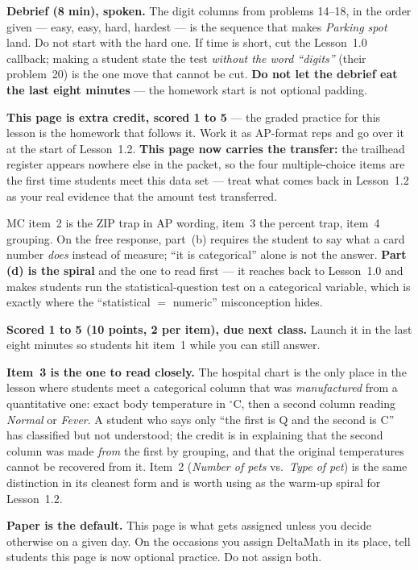 \documentclass[10pt]{article}
\begin{document}
\begin{teachernote}
\textbf{Debrief (8 min), spoken.} The digit columns from problems 14--18, in the order given
--- easy, easy, hard, hardest --- is the sequence that makes \emph{Parking spot} land. Do not
start with the hard one. If time is short, cut the Lesson~1.0 callback; making a student state
the test \emph{without the word ``digits''} (their problem~20) is the one move that cannot be
cut. \textbf{Do not let the debrief eat the last eight minutes} --- the homework start is not
optional padding.
\end{teachernote}

\begin{teachernote}[AP Practice]
\textbf{This page is extra credit, scored 1 to 5} --- the graded practice for this lesson is the homework that
follows it. Work it as AP-format reps and go over it at the start of Lesson~1.2. \textbf{This page now
carries the transfer:} the trailhead register appears nowhere else in the packet, so the four
multiple-choice items are the first time students meet this data set --- treat what comes back
in Lesson~1.2 as your real evidence that the amount test transferred.

MC item~2 is the ZIP trap in AP wording, item~3 the percent trap, item~4 grouping. On the free
response, part~(b) requires the student to say what a card number \emph{does} instead of measure;
``it is categorical'' alone is not the answer. \textbf{Part (d) is the spiral} and the one to read
first --- it reaches back to Lesson~1.0 and makes students run the statistical-question test on a
categorical variable, which is exactly where the ``statistical $=$ numeric'' misconception hides.
\end{teachernote}

\begin{teachernote}[Homework]
\textbf{Scored 1 to 5 (10 points, 2 per item), due next class.} Launch it in the last eight minutes so
students hit item~1 while you can still answer.

\textbf{Item~3 is the one to read closely.} The hospital chart is the only place in the lesson
where students meet a categorical column that was \emph{manufactured} from a quantitative one:
exact body temperature in $^\circ$C, then a second column reading \emph{Normal} or \emph{Fever}.
A student who says only ``the first is Q and the second is C'' has classified but not understood;
the credit is in explaining that the second column was made \emph{from} the first by grouping,
and that the original temperatures cannot be recovered from it. Item~2 (\emph{Number of pets}
vs.\ \emph{Type of pet}) is the same distinction in its cleanest form and is worth using as the
warm-up spiral for Lesson~1.2.

\textbf{Paper is the default.} This page is what gets assigned unless you decide otherwise on a
given day. On the occasions you assign DeltaMath in its place, tell students this page is now optional practice. Do not assign both.
\end{teachernote}
\end{document}
